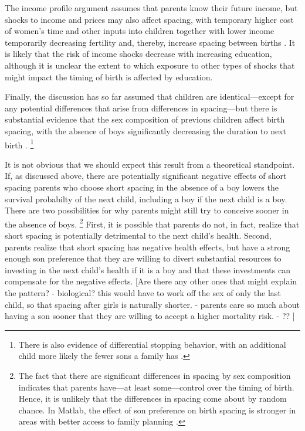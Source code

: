 The income profile argument assumes that parents know their future income, but 
shocks to income and prices may also affect spacing, with temporary higher cost of women's time
and other inputs into children together with lower income temporarily decreasing fertility 
and, thereby, increase spacing between births \citep{Moffitt1984,Hotz1988,Portner2001,Alam2018}.
It is likely that the risk of income shocks decrease with increasing education, although it
is unclear the extent to which exposure to other types of shocks that might impact the timing
of birth is affected by education.


Finally, the discussion has so far assumed that children are identical---except for any 
potential differences that arise from differences in spacing---but there is substantial 
evidence that the sex composition of previous children affect birth spacing, with the
absence of boys significantly decreasing the duration to next birth
\citep{Haughton1995,Haughton1996,Rahman1993,Bhalotra2008,Kumar2016,Soest2018}.%
\footnote{
There is also evidence of differential stopping behavior, with an additional child more 
likely the fewer sons a family has 
\citep{repetto72,Das1987,Arnold1997,arnold98,clark00,Basu2010,Barcellos2014}.
}

It is not obvious that we should expect this result from a theoretical standpoint.
If, as discussed above, there are potentially significant negative effects of short spacing
parents who choose short spacing in the absence of a boy lowers the survival probabilty of
the next child, including a boy if the next child is a boy.
There are two possibilities for why parents might still try to conceive sooner in the 
absence of boys.%
\footnote{
The fact that there are significant differences in spacing by sex composition indicates that
parents have---at least some---control over the timing of birth.
Hence, it is unlikely that the differences in spacing come about by random chance.
In Matlab, the effect of son preference on birth spacing is stronger in areas with better 
access to family planning \citep{Rahman1993}.
}
First, it is possible that parents do not, in fact, realize that short spacing is potentially
detrimental to the next child's health.
Second, parents realize that short spacing has negative health effects, but have a strong
enough son preference that they are willing to divert substantial resources to investing
in the next child's health if it is a boy and that these investments can compensate for 
the negative effects.
[Are there any other ones that might explain the pattern?
    - biological? this would have to work off the sex of only the last child, so that
    spacing after girls is naturally shorter.
    - parents care so much about having a son sooner that they are willing to accept a 
    higher mortality risk.
    - ??
    ]

